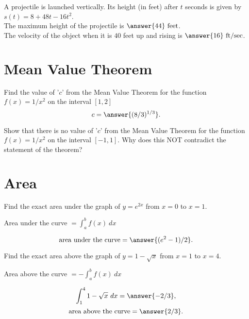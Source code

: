 \documentclass{ximera}
\begin{document}
\begin{problem}
A projectile is launched vertically.  Its height (in feet) after $t$ seconds is given by
$s(t) = 8 + 48t -16t^2$.\\

The maximum height of the projectile is $\answer{44} \ \text{feet}$.\\
The velocity of the object when it is $40$ feet up and rising is $\answer{16} \ \text{ft/sec}$.
\end{problem}


\section{Mean Value Theorem}

\begin{problem}
Find the value of '$c$' from the Mean Value Theorem for the function $f(x) = 1/x^2$ on the interval 
$[1,2]$
\[c=\answer{(8/3)^{1/3}}.\]
\end{problem}

\begin{problem}
Show that there is no value of '$c$' from the Mean Value Theorem for the function 
$f(x) = 1/x^2$ on the interval $[-1, 1]$.  Why does this NOT contradict the statement of the theorem?
\end{problem}

\section{Area}


\begin{problem}
Find the exact area under the graph of $y = e^{2x}$ from $x = 0$ to $x = 1$. \\
\begin{hint}
Area under the curve $= \int_a^b f(x) \ dx$
\end{hint}

\[\text{area under the curve} = \answer{(e^2 -1)/2}.\]
\end{problem}


\begin{problem}
Find the exact area above the graph of $y = 1 - \sqrt x$ from $x = 1$ to $x = 4$. \\
\begin{hint}
Area above the curve $= -\int_a^b f(x) \ dx$
\end{hint}
\[\int_1^4 1 - \sqrt x \ dx = \answer{-2/3},\]
\[\text{area above the curve} = \answer{2/3}.\]
\end{problem}
\end{document}

